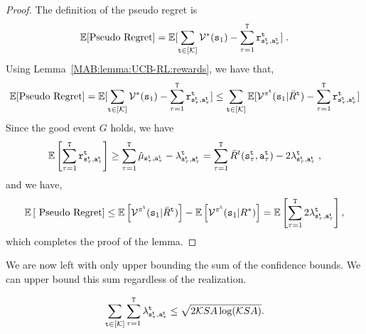 \begin{proof}
    The definition of the pseudo regret is
    \[
    \mathbb{E}[\text{Pseudo Regret}]= \mathbb{E}[\sum_{{\tt t}\in [\mathcal K]} \mathcal{V}^*({\tt s}_1)-\sum_{\tau=1}^{\tt T} {\tt r}^{\tt t}_{{\tt s}_\tau^{\tt t},{\tt a}_\tau^{\tt t}}]\;.
    \]
Using Lemma~\ref{MAB:lemma:UCB-RL:rewards}, we have that,
    \[
    \mathbb{E}[\text{Pseudo Regret}]= \mathbb{E}[\sum_{{\tt t}\in [\mathcal K]} \mathcal{V}^*({\tt s}_1)-\sum_{\tau=1}^{\tt T} {\tt r}^{\tt t}_{{\tt s}_\tau^{\tt t},{\tt a}_\tau^{\tt t}}]
    \leq
    \sum_{{\tt t}\in [\mathcal K]}
    \mathbb{E}[\mathcal{V}^{\pi^{\tt t}}({\tt s}_1|\bar{R}^{\tt t})
    -\sum_{\tau=1}^{\tt T} {\tt r}^{\tt t}_{{\tt s}_\tau^{\tt t},{\tt a}_\tau^{\tt t}}]
    \]
Since the good event $G$ holds, we have 
\[
\mathbb{E}\left[\sum_{\tau=1}^{\tt T} {\tt r}^{\tt t}_{{\tt s}_\tau^{\tt t},{\tt a}_\tau^{\tt t}}\right] \geq \sum_{\tau=1}^{\tt T}
 \hat{\mu}_{{\tt s}_\tau^{\tt t},{\tt a}_\tau^{\tt t}}-\lambda^{\tt t}_{{\tt s}_\tau^{\tt t},{\tt a}_\tau^{\tt t}}=\sum_{\tau=1}^{\tt T}\bar{R}^t({\tt s}_\tau^{\tt t},{\tt a}_\tau^{\tt t})-2\lambda^{\tt t}_{{\tt s}_\tau^{\tt t},{\tt a}_\tau^{\tt t}}\;,
\]
and we have,
\[
\mathbb{E}\left[\text{ Pseudo Regret}\right]\leq \mathbb{E}\left[\mathcal{V}^{\pi^{\tt t}}({\tt s}_1|\bar{R}^{\tt t})\right] -
\mathbb{E}\left[\mathcal{V}^{\pi^{\tt t}}({\tt s}_1|R^*)\right]=
\mathbb{E}\left[\sum_{\tau=1}^{\tt T} 2\lambda^{\tt t}_{{\tt s}_\tau^{\tt t},{\tt a}_\tau^{\tt t}} \right],
\]
which completes the proof of the lemma.
\end{proof}

We are now left with only upper bounding the sum of the confidence bounds.
We can upper bound this sum regardless of the realization. 

\begin{lemma}
    \[
    \sum_{{\tt t}\in [\mathcal K]} \sum_{\tau=1}^{\tt T}
\lambda^{\tt t}_{{\tt s}_\tau^{\tt t},{\tt a}_\tau^{\tt t}}
    \leq \sqrt{2\mathcal K SA\log (\mathcal K SA)}.
    \]
\end{lemma}

